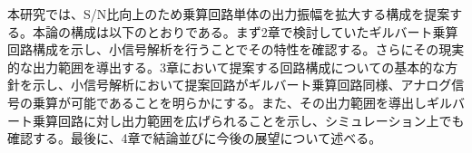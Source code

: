 \par
本研究では、S/N比向上のため乗算回路単体の出力振幅を拡大する構成を提案する。本論の構成は以下のとおりである。まず2章で検討していたギルバート乗算回路構成を示し、小信号解析を行うことでその特性を確認する。さらにその現実的な出力範囲を導出する。3章において提案する回路構成についての基本的な方針を示し、小信号解析において提案回路がギルバート乗算回路同様、アナログ信号の乗算が可能であることを明らかにする。また、その出力範囲を導出しギルバート乗算回路に対し出力範囲を広げられることを示し、シミュレーション上でも確認する。最後に、4章で結論並びに今後の展望について述べる。